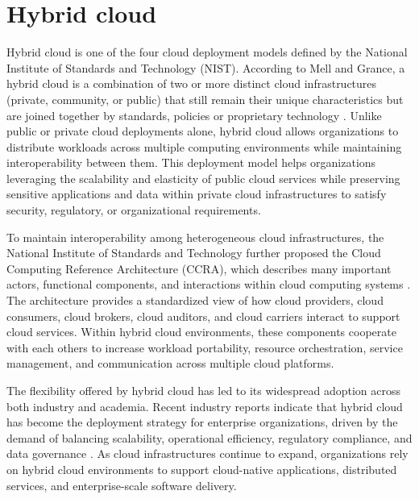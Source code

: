 \section{Hybrid cloud}
\label{sec:Hybrid_cloud}

Hybrid cloud is one of the four cloud deployment models defined by the National Institute of Standards and Technology (NIST). According to Mell and Grance, a hybrid cloud is a combination of two or more distinct cloud infrastructures (private, community, or public) that  still remain their unique characteristics but are joined together by standards, policies or proprietary technology \cite{Mell2011NIST}. Unlike public or private cloud deployments alone, hybrid cloud allows organizations to distribute workloads across multiple computing environments while maintaining interoperability between them. This deployment model helps organizations leveraging the scalability and elasticity of public cloud services while preserving sensitive applications and data within private cloud infrastructures to satisfy security, regulatory, or organizational requirements.

To maintain interoperability among heterogeneous cloud infrastructures, the National Institute of Standards and Technology further proposed the Cloud Computing Reference Architecture (CCRA), which describes many important actors, functional components, and interactions within cloud computing systems \cite{Liu2011NISTRA}. The architecture provides a standardized view of how cloud providers, cloud consumers, cloud brokers, cloud auditors, and cloud carriers interact to support cloud services. Within hybrid cloud environments, these components cooperate with each others to increase workload portability, resource orchestration, service management, and communication across multiple cloud platforms.

The flexibility offered by hybrid cloud has led to its widespread adoption across both industry and academia. Recent industry reports indicate that hybrid cloud has become the deployment strategy for enterprise organizations, driven by the demand of balancing scalability, operational efficiency, regulatory compliance, and data governance \cite{Flexera2025StateCloud, HashiCorp2025StateCloud}. As cloud infrastructures continue to expand, organizations rely on hybrid cloud environments to support cloud-native applications, distributed services, and enterprise-scale software delivery.